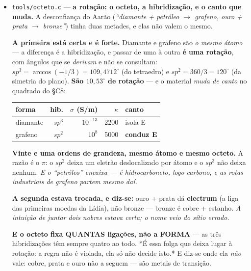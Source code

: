 \documentclass[11pt]{article}
\newcommand{\code}[1]{\texttt{\small #1}}
\theoremstyle{plain}
\theoremstyle{remark}
\begin{document}
\begin{itemize}
\emph{Os quatro cantos existem e são ocupados por materiais reais.} E o headjack usa \textbf{três}:
prata na antena, Bi$_2$Te$_3$ no Seebeck (\emph{tem} de isolar calor, senão $ZT$ cai), diamante no
dissipador (\emph{e isola E, logo não curto-circuita a antena}). O quarto é o substrato.
\textbf{21 unidades, resíduo 0.}


\item \code{tools/octeto.c} --- \textbf{a rotação: o octeto, a hibridização, e o canto que muda.} A
desconfiança do Aarão (\emph{``diamante + petróleo $\to$ grafeno, ouro + prata $\to$ bronze''}) tinha
duas metades, e elas não valem o mesmo.

\textbf{A primeira está certa e é forte.} Diamante e grafeno são \emph{o mesmo átomo} --- a diferença
é a hibridização, e passar de uma à outra \textbf{é uma rotação}, com ângulos que se \emph{derivam}
e não se consultam: $sp^3 = \arccos(-1/3) = 109{,}4712^\circ$ (do tetraedro) e $sp^2 = 360/3 = 120^\circ$
(da simetria do plano). \textbf{São $10{,}53^\circ$ de rotação} --- e o material \emph{muda de canto}
no quadrado do §C8:

\begin{center}
\begin{tabular}{lrrrl}
\toprule
forma & hib. & $\sigma$ (S/m) & $\kappa$ & canto \\
\midrule
diamante & $sp^3$ & $10^{-13}$ & 2200 & isola E \\
grafeno & $sp^2$ & $10^{8}$ & 5000 & \textbf{conduz E} \\
\bottomrule
\end{tabular}
\end{center}

\textbf{Vinte e uma ordens de grandeza, mesmo átomo e mesmo octeto.} A razão é o $\pi$: o $sp^2$
deixa um eletrão deslocalizado por átomo e o $sp^3$ não deixa nenhum. \emph{E o ``petróleo'' encaixa
--- é hidrocarboneto, logo carbono, e as rotas industriais de grafeno partem mesmo daí.}

\textbf{A segunda estava trocada, e diz-se:} ouro + prata dá \textbf{electrum} (a liga das primeiras
moedas da Lídia), não bronze --- bronze é cobre + estanho. \emph{A intuição de juntar dois nobres
estava certa; o nome veio do sítio errado.}

\textbf{E o octeto fixa QUANTAS ligações, não a FORMA} --- as três hibridizações têm sempre quatro
ao todo. *É essa folga que deixa lugar à rotação: a regra não é violada, ela só não decide isto.* E
diz-se onde ela \emph{não} vale: cobre, prata e ouro não a seguem --- são metais de transição.


\end{itemize}
\end{document}
